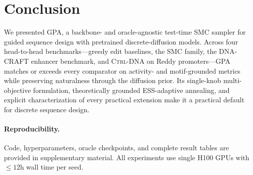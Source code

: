 \documentclass{article}
\theoremstyle{definition}
\theoremstyle{remark}
\newcommand{\gpa}{\textsc{GPA}\xspace}
\newcommand{\ctrldna}{\textsc{Ctrl-DNA}\xspace}
\newcommand{\dnacraft}{\textsc{DNA-CRAFT}\xspace}
\begin{document}
\section{Conclusion}\label{sec:conc}

We presented \gpa{}, a backbone- and oracle-agnostic test-time SMC sampler for guided sequence design with pretrained discrete-diffusion models. Across four head-to-head benchmarks—greedy edit baselines, the SMC family, the \dnacraft{} enhancer benchmark, and \ctrldna{} on Reddy promoters—\gpa{} matches or exceeds every comparator on activity- and motif-grounded metrics while preserving naturalness through the diffusion prior. Its single-knob multi-objective formulation, theoretically grounded ESS-adaptive annealing, and explicit characterization of every practical extension make it a practical default for discrete sequence design.

\paragraph{Reproducibility.}
Code, hyperparameters, oracle checkpoints, and complete result tables are provided in supplementary material. All experiments use single H100 GPUs with $\leq\!12$h wall time per seed.




\appendix

\end{document}
